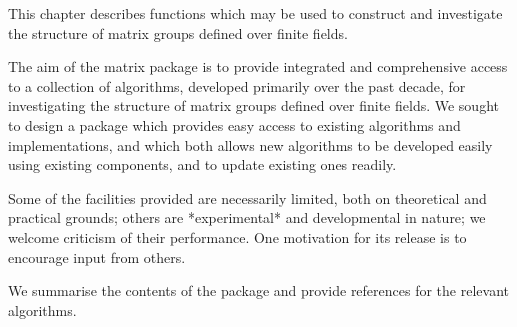 \def\GL{{\rm GL}}
\def\GU{{\rm GU}}
\def\SU{{\rm SU}}
\def\GO{{\rm GO}}
\def\Sp{{\rm Sp}}
\def\GSp{{\rm GSp}}
\def\SL{{\rm SL}}
\def\O{{\Omega}}
\def\log{{\rm log}}


This chapter    describes functions which  may be   used to construct and
investigate the structure of matrix groups defined over finite fields.


The aim of the matrix package is to provide  integrated and comprehensive
access to a collection  of algorithms, developed  primarily over the past
decade, for   investigating the structure of   matrix groups defined over
finite fields.  We sought to design  a package which provides easy access
to  existing  algorithms and implementations,   and which both allows new
algorithms   to be  developed  easily using  existing  components, and to
update existing ones readily.

Some   of  the facilities    provided are necessarily   limited,  both on
theoretical  and practical    grounds;  others   are *experimental*   and
developmental in  nature;  we  welcome criticism  of  their performance.  
One motivation  for its release  is to encourage input from others.


We summarise the contents of the package and provide references for
the relevant algorithms.

